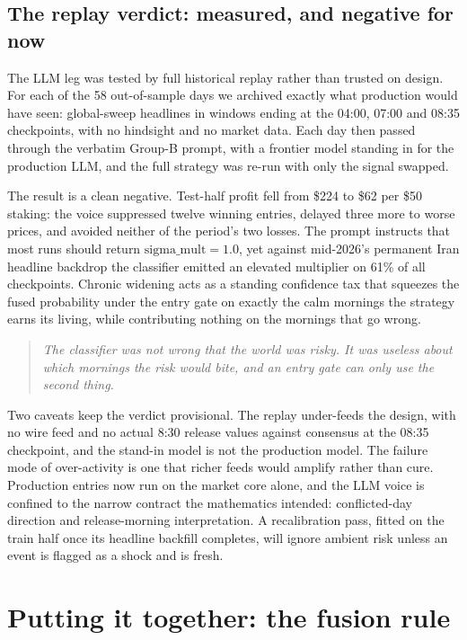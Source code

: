 \documentclass[11pt,a4paper]{article}
\newcommand{\intuition}[1]{\begin{quote}\small\itshape #1\end{quote}}
\begin{document}
\subsection{The replay verdict: measured, and negative for now}

The LLM leg was tested by full historical replay rather than trusted on
design. For each of the 58 out-of-sample days we archived exactly what
production would have seen: global-sweep headlines in windows ending at the
04:00, 07:00 and 08:35 checkpoints, with no hindsight and no market data.
Each day then passed through the verbatim Group-B prompt, with a frontier
model standing in for the production LLM, and the full strategy was re-run
with only the signal swapped.

The result is a clean negative. Test-half profit fell from \$224 to \$62
per \$50 staking: the voice suppressed twelve winning entries, delayed
three more to worse prices, and avoided neither of the period's two losses.
The prompt instructs that most runs should return
$\text{sigma\_mult} = 1.0$, yet against mid-2026's permanent Iran headline
backdrop the classifier emitted an elevated multiplier on 61\% of all
checkpoints. Chronic widening acts as a standing confidence tax that
squeezes the fused probability under the entry gate on exactly the calm
mornings the strategy earns its living, while contributing nothing on the
mornings that go wrong.

\intuition{The classifier was not wrong that the world was risky. It was
useless about \emph{which mornings} the risk would bite, and an entry gate
can only use the second thing.}

Two caveats keep the verdict provisional. The replay under-feeds the
design, with no wire feed and no actual 8:30 release values against
consensus at the 08:35 checkpoint, and the stand-in model is not the
production model. The failure mode of over-activity is one that richer
feeds would amplify rather than cure. Production entries now run on the
market core alone, and the LLM voice is confined to the narrow contract the
mathematics intended: conflicted-day direction and release-morning
interpretation. A recalibration pass, fitted on the train half once its
headline backfill completes, will ignore ambient risk unless an event is
flagged as a shock and is fresh.

\section{Putting it together: the fusion rule}
\end{document}
